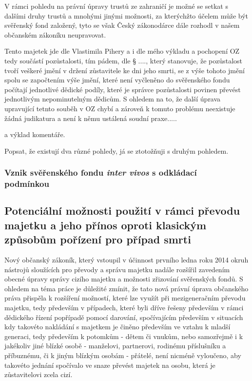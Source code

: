 \documentclass{article}
\begin{document}

V rámci pohledu na právní úpravy trustů ze zahraničí je možné se setkat s dalšími druhy trustů a mnohými jinými možnosti, za kterýchžto účelem může být svěřenský fond založený, tyto se však Český zákonodárce dále rozhodl v našem občanském zákoníku neupravovat.

\newpage
\thispagestyle{smallertextinheader}

Tento majetek jde dle Vlastimila Pihery a i dle mého výkladu a pochopení OZ tedy součástí pozůstalosti, tím pádem, dle § ...., který stanovuje, že pozůstalost tvoří veškeré jmění v držení zůstavitele ke dni jeho smrti, se z výše tohoto jmění spolu se započtením výše jmění, které není vyčleněno do svěřenského fondu počítají jednotlivé dědické podíly, které je správce pozůstalosti povinen převést jednotlivým nepominutelným dědicům. S ohledem na to, že další úprava upravující tetnto souběh v OZ chybí a zároveň k tomuto problému neexistuje žádná judikatura a není k němu ustálená soudní praxe.....

a výklad komentáře.

Popsat, že existují dva různé pohledy, já se ztotožňuji s druhým pohledem.

\subsubsection[Vznik svěřenského fondu \textit{inter vivos} s odkládacé podmínkou]{Vznik svěřenského fondu \textit{inter vivos} s odkládací\\ podmínkou}

\newpage
\thispagestyle{smallertextinheader}

\subsection{Potenciální možnosti použití v rámci převodu majetku a jeho přínos oproti klasickým způsobům pořízení pro případ smrti}

Nový občanský zákoník, který vstoupil v účinnost prvního ledna roku 2014 okruh nástrojů sloužících pro převody a správu majetku nadále rozšířil zavedením obecné úpravy správy cizího majetku a možnosti zřizování svěřenských fondů. S ohledem na téma práce je důležité zmínit, že tato nová právní úprava občanského práva přispěla k rozšíření možností, které lze využít při mezigeneračním převodu majetku, tedy především v případech, které byli dříve řešeny především v rámci dědického řízení popřípadě pomocí darování, spočívajícím především v situacích kdy takovéto nakládání s majetkem je činěno především ve vztahu k mladší generaci, tedy především k potomkům - dětem či vnukům, nebo samozřejmě i k jakékoliv jiné blízké osobě - manželovi, partnerovi, rodinému příslušníku a příbuznému, či k jiným blízkým osobám - přátelé, není nicméně vyloučeno, aby takovéto jednání spočívalo ve snaze převést majetek na osobu, která je zůstavitelovi zcela cizí. \\
\end{document}
